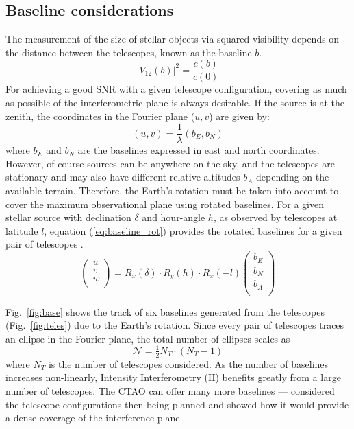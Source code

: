 \subsection{Baseline considerations}\label{sec:earth}
The measurement of the size of stellar objects via squared visibility depends on the distance between the telescopes, known as the baseline $b$.
\begin{equation}
	|V_{12}(b)|^2 = \frac{c(b)}{c(0)}
	\label{eq:angular_size_meas}
\end{equation}
For achieving a good SNR with a given telescope configuration, covering as much as possible of the interferometric plane is always desirable. If the source is at the zenith, the coordinates in the Fourier plane ($u,v$) are given by:
\begin{equation}
	(u,v) = \frac{1}{\lambda} (b_E, b_N)
\end{equation}
where $b_E$ and $b_N$ are the baselines expressed in east and north coordinates. However, of course sources can be anywhere on the sky, and the telescopes are stationary and may also have different relative altitudes $b_A$ depending on the available terrain. Therefore, the Earth's rotation must be taken into account to cover the maximum observational plane using rotated baselines. For a given stellar source with declination $\delta$ and hour-angle $h$, as observed by telescopes at latitude $l$, equation (\ref{eq:baseline_rot}) provides the rotated baselines for a given pair of telescopes \citep[see e.g., eqs.~8--10 from][]{2020MNRAS.498.4577B}.
\begin{equation}
\begin{pmatrix} u\\ v\\ w\\ \end{pmatrix} = R_x(\delta) \cdot R_y(h) \cdot R_x(-l) \begin{pmatrix} b_E \\ b_N \\ b_A \\ \end{pmatrix}
	\label{eq:baseline_rot}
\end{equation}

Fig.~\ref{fig:base} shows the track of six baselines generated from the telescopes (Fig.~\ref{fig:teles}) due to the Earth's rotation. Since every pair of telescopes traces an ellipse in the Fourier plane, the total number of ellipses scales as
\begin{equation}
	\label{eq:N_telescopes}
	\mathcal{N} = \tfrac12 N_T \cdot (N_T -1)
\end{equation}
where $N_T$ is the number of telescopes considered.
As the number of baselines increases non-linearly, Intensity Interferometry (II) benefits greatly from a large number of telescopes. The CTAO can offer many more baselines --- \cite{2013APh....43..331D} considered the telescope configurations then being planned and showed how it would provide a dense coverage of the interference plane.

